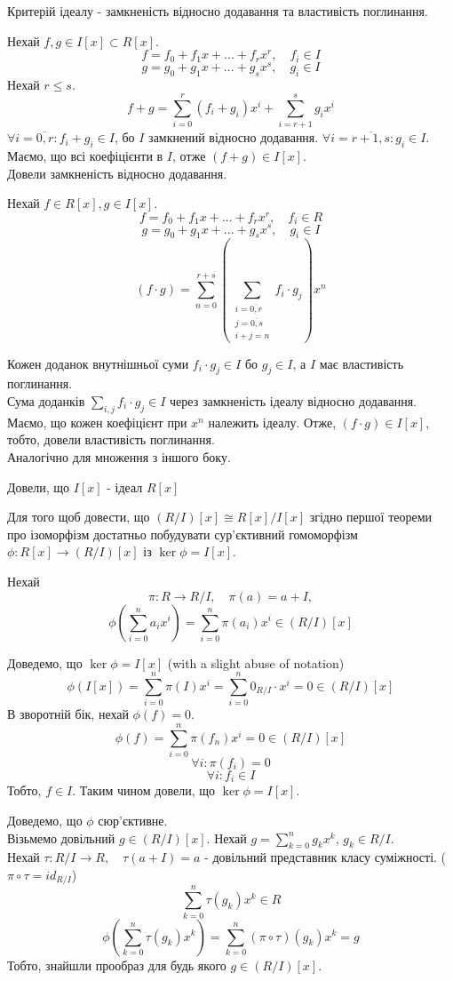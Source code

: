 \documentclass[11pt, a4paper]{article} %
\begin{document}
Критерій ідеалу - замкненість відносно додавання та властивість поглинання.

Нехай $f,g \in I[x] \subset R[x]$.
\[f = f_0 + f_1x + ... + f_rx^r, \quad f_i \in I\]
\[g = g_0 + g_1x + ... + g_sx^s, \quad g_i \in I\]
Нехай $r \le s$.
\[f+g = \sum_{i=0}^r (f_i + g_i)x^i + \sum_{i=r+1}^s g_i x^i\]
$\forall i=\overline{0,r}: f_i+g_i \in I$, бо $I$ замкнений відносно додавання. $\forall i=\overline{r+1,s}: g_i \in I$.
Маємо, що всі коефіцієнти в $I$, отже $(f+g) \in I[x]$. \\
Довели замкненість відносно додавання.

Нехай $f \in R[x], g \in I[x]$.
\[f = f_0 + f_1x + ... + f_rx^r, \quad f_i \in R\]
\[g = g_0 + g_1x + ... + g_sx^s, \quad g_i \in I\]
\[(f \cdot g) = \sum_{n=0}^{r+s} \left(\sum_{\substack{i=\overline{0,r} \\ j=\overline{0,s} \\ i+j=n}} f_i \cdot g_j\right) x^n\]

Кожен доданок внутнішньої суми $f_i \cdot g_j \in I$ бо $g_j \in I$, а $I$ має властивість поглинання.\\
Сума доданків $\sum_{i,j} f_i\cdot g_j \in I$ через замкненість ідеалу відносно додавання.\\
Маємо, що кожен коефіцієнт при $x^n$ належить ідеалу. Отже, $(f\cdot g)\in I[x]$, тобто, довели властивість поглинання.\\
Аналогічно для множення з іншого боку.

\begin{mdframed}[backgroundcolor=green!20]
    Довели, що $I[x]$ - ідеал $R[x]$
\end{mdframed}

Для того щоб довести, що $(R/I)[x] \cong R[x]/I[x]$ згідно першої теореми про ізоморфізм достатньо 
побудувати сур'єктивний гомоморфізм $\phi : R[x] \to (R/I)[x]$ із $\ker \phi = I[x]$.

Нехай 
\[\pi : R \to R/I, \quad \pi(a) = a+I,\]
\[\phi(\sum_{i=0}^n a_i x^i) = \sum_{i=0}^n \pi(a_i)x^i \in (R/I)[x]\]

Доведемо, що $\ker \phi = I[x]$ (with a slight abuse of notation)
\[\phi(I[x]) = \sum_{i=0}^n \pi(I)x^i =\sum_{i=0}^n 0_{R/I} \cdot x^i = 0 \in (R/I)[x]\]
В зворотній бік, нехай $\phi(f) = 0$.
\[\phi(f) = \sum_{i=0}^n \pi(f_n)x^i = 0 \in (R/I)[x]\]
\[\forall i: \pi(f_i) = 0\]
\[\forall i: f_i \in I\]
Тобто, $f \in I$. Таким чином довели, що $\ker \phi = I[x]$.

Доведемо, що $\phi$ сюр'єктивне.\\
Візьмемо довільний $g \in (R/I)[x]$.
Нехай $g = \sum_{k=0}^n g_k x^k$, $g_k \in R/I$.\\
Нехай $\tau : R/I \to R, \quad \tau(a + I) = a$ - довільний представник класу суміжності. ($\pi \circ \tau = id_{R/I}$)
\[\sum_{k=0}^n \tau(g_k) x^k \in R\]
\[\phi(\sum_{k=0}^n \tau(g_k) x^k) = \sum_{k=0}^n (\pi\circ\tau)(g_k) x^k = g\]
Тобто, знайшли прообраз для будь якого $g \in (R/I)[x]$.
\end{document}
